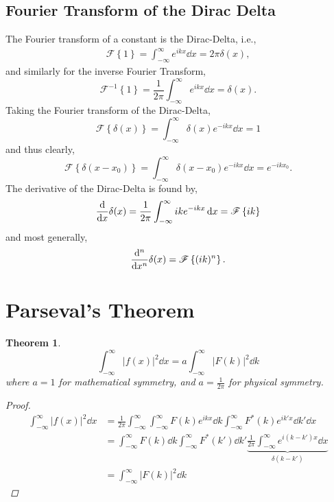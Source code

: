 \documentclass{book}
\newtheorem*{theorem}{Theorem}
\begin{document}
\subsection{Fourier Transform of the Dirac Delta}
The Fourier transform of a constant is the Dirac-Delta, i.e.,
\begin{align}
	\mathscr{F}\left\{1\right\} = \int_{-\infty}^{\infty}e^{ikx}\dd{x} = 2\pi\delta(x),
\end{align}
and similarly for the inverse Fourier Transform,
\begin{equation}
	\mathscr{F}^{-1}\left\{1\right\} = \frac{1}{2\pi}\int_{-\infty}^{\infty}e^{ikx}\dd{x} = \delta(x).
\end{equation}
Taking the Fourier transform of the Dirac-Delta,
\begin{equation}
	\mathscr{F}\left\{\delta(x)\right\} = \int_{-\infty}^{\infty}\delta(x)e^{-ikx}\dd{x} = 1
\end{equation}
and thus clearly,
\begin{equation}
	\mathscr{F}\left\{\delta(x - x_0)\right\} = \int_{-\infty}^{\infty}\delta(x - x_0)e^{-ikx}\dd{x} = e^{-ikx_0}.
\end{equation}
The derivative of the Dirac-Delta is found by,
\begin{equation}
	\dv{x}\delta(x) = \frac{1}{2\pi}\int_{-\infty}^{\infty}ike^{-ikx}\dd{x} = \mathscr{F}\left\{ik\right\}
\end{equation}
and most generally,
\begin{equation}
	\dv[n]{x}\delta(x) = \mathscr{F}\left\{(ik)^n\right\}.
\end{equation}
\section{Parseval's Theorem}
\begin{theorem}
\begin{equation}
	\boxed{\int_{-\infty}^{\infty} \left|f(x)\right|^2\dd{x} = a\int_{-\infty}^{\infty}\left|F(k)\right|^2\dd{k}}
\end{equation}
where $a=1$ for mathematical symmetry, and $a= \frac{1}{2\pi}$ for physical symmetry.
\begin{proof}
	\begin{equation}
		\begin{split}
		\int_{-\infty}^{\infty}\left|f(x)\right|^2\dd{x} &= \frac{1}{2\pi}\int_{-\infty}^{\infty}\int_{-\infty}^{\infty}F(k)e^{ikx}\dd{k}\int_{-\infty}^{\infty}F^*(k)e^{ik'x}\dd{k'}\dd{x}\\
		& = \int_{-\infty}^{\infty}F(k)\dd{k}\int_{-\infty}^{\infty}F^*(k')\dd{k'}\underbrace{\frac{1}{2\pi}\int_{-\infty}^{\infty}e^{i(k-k')x}\dd{x}}_{\delta(k-k')} \\
		& = \int_{-\infty}^{\infty}\left|F(k)\right|^2 \dd{k}
		\end{split}
	\end{equation}
\end{proof}
\end{theorem}
\end{document}
